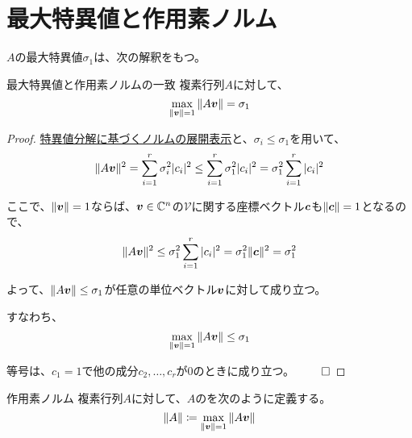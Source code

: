 \documentclass[../../../topic_linear-algebra]{subfiles}
\begin{document}
\sectionline
\section{最大特異値と作用素ノルム}

$A$の最大特異値$\sigma_1$は、次の解釈をもつ。

\begin{theorem*}{最大特異値と作用素ノルムの一致}
  複素行列$A$に対して、
  \begin{equation*}
    \max_{\| \vb*{v} \| = 1}{\| A \vb*{v} \|} = \sigma_1
  \end{equation*}
\end{theorem*}

\begin{proof}
  \hyperref[thm:norm-expansion-svd]{特異値分解に基づくノルムの展開表示}と、$\sigma_i \leq \sigma_1$を用いて、
  \begin{equation*}
    \| A \vb*{v} \|^2 = \sum_{i=1}^r \sigma_i^2 |c_i|^2 \leq \sum_{i=1}^r \sigma_1^2 |c_i|^2 = \sigma_1^2 \sum_{i=1}^r |c_i|^2
  \end{equation*}
  
  ここで、$\| \vb*{v} \| = 1$ならば、$\vb*{v} \in \mathbb{C}^n$の$\mathcal{V}$に関する座標ベクトル$\vb*{c}$も$\| \vb*{c} \| = 1$となるので、
  \begin{equation*}
    \| A \vb*{v} \|^2 \leq \sigma_1^2 \sum_{i=1}^r |c_i|^2 = \sigma_1^2 \| \vb*{c} \|^2 = \sigma_1^2
  \end{equation*}
  
  よって、$\| A \vb*{v} \| \leq \sigma_1$が任意の単位ベクトル$\vb*{v}$に対して成り立つ。
  
  すなわち、
  \begin{equation*}
    \max_{\| \vb*{v} \| = 1} \| A \vb*{v} \| \leq \sigma_1
  \end{equation*}
  
  等号は、$c_1 = 1$で他の成分$c_2, \dots, c_r$が0のときに成り立つ。 $\qed$
\end{proof}

\br

\begin{definition}{作用素ノルム}
  複素行列$A$に対して、$A$のを次のように定義する。
  \begin{equation*}
    \| A \| \coloneq \max_{\| \vb*{v} \| = 1} \| A \vb*{v} \|
  \end{equation*}
\end{definition}
\end{document}
